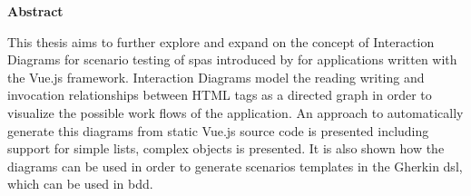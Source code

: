 \thispagestyle{empty}
\begin{center}
    
    \vspace{0.9cm}
    \large{}
    \textbf{Abstract}

\end{center}
\begin{center}
\vspace{0.3cm}
\large{}
\vspace{0.4cm}
This thesis aims to further explore and expand on the concept of Interaction Diagrams for scenario testing of \glspl{spa} introduced by \cite{zhang2019scenario} for applications written with the Vue.js framework. Interaction Diagrams model the reading writing and invocation relationships between HTML tags as a directed graph in order to visualize the possible work flows of the application. An approach to automatically generate this diagrams from static Vue.js source code is presented including support for simple lists, complex objects is presented. It is also shown how the diagrams can be used in order to generate scenarios templates in the Gherkin \gls{dsl}, which can be used in \gls{bdd}.
\end{center}